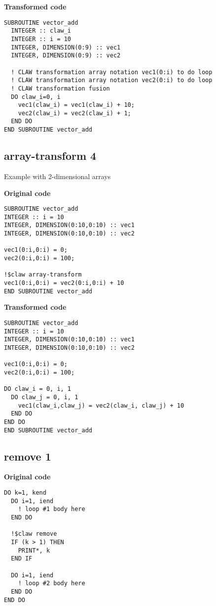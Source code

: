 \documentclass{article}
\begin{document}
\textbf{Transformed code}
\begin{lstlisting}
SUBROUTINE vector_add
  INTEGER :: claw_i
  INTEGER :: i = 10
  INTEGER, DIMENSION(0:9) :: vec1
  INTEGER, DIMENSION(0:9) :: vec2

  ! CLAW transformation array notation vec1(0:i) to do loop
  ! CLAW transformation array notation vec2(0:i) to do loop
  ! CLAW transformation fusion
  DO claw_i=0, i
    vec1(claw_i) = vec1(claw_i) + 10;
    vec2(claw_i) = vec2(claw_i) + 1;
  END DO
END SUBROUTINE vector_add
\end{lstlisting}


\subsection{array-transform 4}
\label{array-transform4}
Example with 2-dimensional arrays

\textbf{Original code}
\begin{lstlisting}
SUBROUTINE vector_add
INTEGER :: i = 10
INTEGER, DIMENSION(0:10,0:10) :: vec1
INTEGER, DIMENSION(0:10,0:10) :: vec2

vec1(0:i,0:i) = 0;
vec2(0:i,0:i) = 100;

!$claw array-transform
vec1(0:i,0:i) = vec2(0:i,0:i) + 10
END SUBROUTINE vector_add
\end{lstlisting}

\textbf{Transformed code}
\begin{lstlisting}
SUBROUTINE vector_add
INTEGER :: i = 10
INTEGER, DIMENSION(0:10,0:10) :: vec1
INTEGER, DIMENSION(0:10,0:10) :: vec2

vec1(0:i,0:i) = 0;
vec2(0:i,0:i) = 100;

DO claw_i = 0, i, 1
  DO claw_j = 0, i, 1
    vec1(claw_i,claw_j) = vec2(claw_i, claw_j) + 10    
  END DO
END DO
END SUBROUTINE vector_add
\end{lstlisting}

\subsection{remove 1}
\label{remove1}

\textbf{Original code}
\begin{lstlisting}
DO k=1, kend
  DO i=1, iend
    ! loop #1 body here
  END DO

  !$claw remove
  IF (k > 1) THEN
    PRINT*, k
  END IF

  DO i=1, iend
    ! loop #2 body here
  END DO
END DO
\end{lstlisting}
\end{document}
